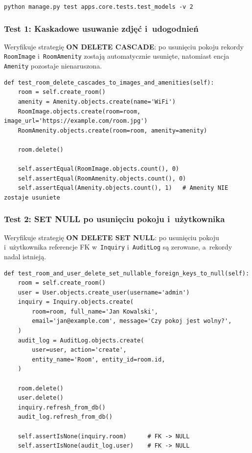 \documentclass[12pt,a4paper]{article}
\begin{document}
\begin{lstlisting}[style=consolestyle, caption={Uruchamianie testów}]
python manage.py test apps.core.tests.test_models -v 2
\end{lstlisting}

\subsubsection*{Test 1: Kaskadowe usuwanie zdjęć i~udogodnień}

Weryfikuje strategię \textbf{ON DELETE CASCADE}: po usunięciu pokoju
rekordy \texttt{RoomImage} i~\texttt{RoomAmenity} zostają automatycznie usunięte,
natomiast encja \texttt{Amenity} pozostaje nienaruszona.

\begin{lstlisting}[style=pythonstyle, caption={test\_room\_delete\_cascades\_to\_images\_and\_amenities}]
def test_room_delete_cascades_to_images_and_amenities(self):
    room = self.create_room()
    amenity = Amenity.objects.create(name='WiFi')
    RoomImage.objects.create(room=room, image_url='https://example.com/room.jpg')
    RoomAmenity.objects.create(room=room, amenity=amenity)

    room.delete()

    self.assertEqual(RoomImage.objects.count(), 0)
    self.assertEqual(RoomAmenity.objects.count(), 0)
    self.assertEqual(Amenity.objects.count(), 1)   # Amenity NIE zostaje usuniete
\end{lstlisting}

\subsubsection*{Test 2: SET NULL po usunięciu pokoju i~użytkownika}

Weryfikuje strategię \textbf{ON DELETE SET NULL}: po usunięciu pokoju i~użytkownika
referencje FK w~\texttt{Inquiry} i~\texttt{AuditLog} są zerowane,
a~rekordy nadal istnieją.

\begin{lstlisting}[style=pythonstyle, caption={test\_room\_and\_user\_delete\_set\_nullable\_foreign\_keys\_to\_null}]
def test_room_and_user_delete_set_nullable_foreign_keys_to_null(self):
    room = self.create_room()
    user = User.objects.create_user(username='admin')
    inquiry = Inquiry.objects.create(
        room=room, full_name='Jan Kowalski',
        email='jan@example.com', message='Czy pokoj jest wolny?',
    )
    audit_log = AuditLog.objects.create(
        user=user, action='create',
        entity_name='Room', entity_id=room.id,
    )

    room.delete()
    user.delete()
    inquiry.refresh_from_db()
    audit_log.refresh_from_db()

    self.assertIsNone(inquiry.room)      # FK -> NULL
    self.assertIsNone(audit_log.user)    # FK -> NULL
\end{lstlisting}
\end{document}
